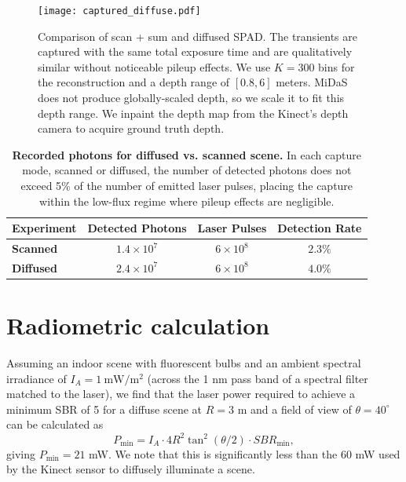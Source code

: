 \documentclass[runningheads]{llncs}
\begin{document}
\begin{figure}[ht!]
  \centering \texttt{[image: captured\_diffuse.pdf]}
  \caption{Comparison of scan + sum and diffused SPAD. The transients are captured
      with the same total exposure time and are qualitatively similar without 
      noticeable pileup effects. We use $K = 300$ bins for the reconstruction
      and a depth range of $[0.8, 6]$ meters. MiDaS \cite{Lasinger:2019} does
      not produce globally-scaled depth, so we scale it to fit this depth range.
      We inpaint the depth map from the Kinect's depth camera to acquire ground
      truth depth.}
  \label{fig:comparison}
\end{figure}

\begin{table}[ht!]
    \renewcommand{\arraystretch}{1.3}
    \setlength{\tabcolsep}{10pt}
     \centering
     \begin{tabular}{lccc} \toprule
         \textbf{Experiment} & \textbf{Detected Photons} & \textbf{Laser Pulses} & \textbf{Detection Rate} \\\hline
         \textbf{Scanned} & $1.4\times10^7$ & $6\times10^8$ & $2.3\%$ \\
         \textbf{Diffused} & $2.4\times10^7$ & $6\times10^8$ & $4.0\%$ \\
        \bottomrule
    \end{tabular}
    \vspace{0.4em}
    \caption{\textbf{Recorded photons for diffused vs. scanned scene.} In each capture mode, scanned or diffused, the number of detected photons does not exceed 5\% of the number of emitted laser pulses, placing the capture within the low-flux regime where pileup effects are negligible.}
    \label{tab:photon_counts}
\end{table}

\section{Radiometric calculation}
Assuming an indoor scene with fluorescent bulbs and an ambient spectral irradiance of $I_A =
1~\text{mW}/\text{m}^2$ (across the 1 nm pass band of a spectral filter matched
to the laser), we find that the laser power required to achieve a minimum SBR of
5 for a diffuse scene at $R = 3$ m and a field of view of
$\theta = 40^\circ$ can be calculated as
%
\begin{equation}
  P_{\text{min}} = I_A \cdot 4 R^2 \tan^2(\theta/2) \cdot SBR_{\text{min}},
\end{equation}
giving $P_{\text{min}}=21$ mW. We note that this is significantly
less than the 60 mW used by the Kinect sensor to diffusely illuminate a scene.
\end{document}
